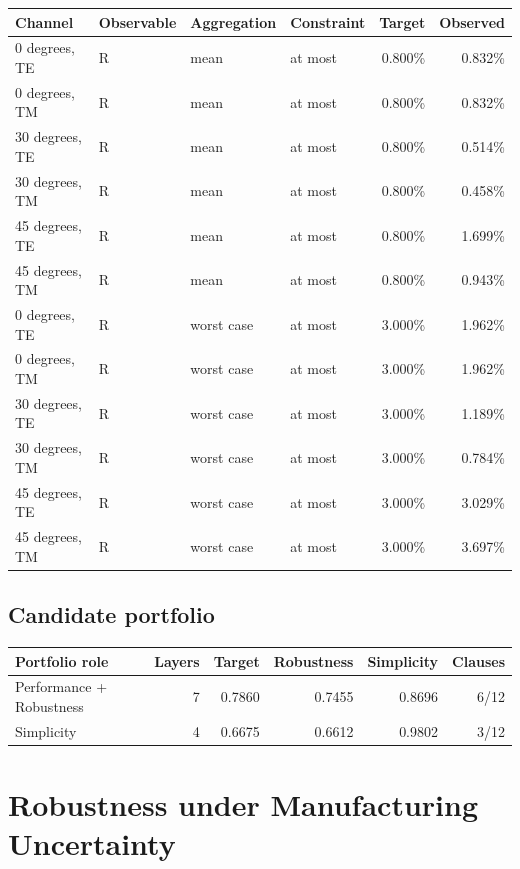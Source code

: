 \documentclass[11pt]{article}
\begin{document}
\begin{longtable}[]{@{}llllrr@{}}
\toprule
Channel & Observable & Aggregation & Constraint & Target & Observed \\
\midrule
\endhead
0 degrees, TE & R & mean & at most & 0.800\% & 0.832\% \\
0 degrees, TM & R & mean & at most & 0.800\% & 0.832\% \\
30 degrees, TE & R & mean & at most & 0.800\% & 0.514\% \\
30 degrees, TM & R & mean & at most & 0.800\% & 0.458\% \\
45 degrees, TE & R & mean & at most & 0.800\% & 1.699\% \\
45 degrees, TM & R & mean & at most & 0.800\% & 0.943\% \\
0 degrees, TE & R & worst case & at most & 3.000\% & 1.962\% \\
0 degrees, TM & R & worst case & at most & 3.000\% & 1.962\% \\
30 degrees, TE & R & worst case & at most & 3.000\% & 1.189\% \\
30 degrees, TM & R & worst case & at most & 3.000\% & 0.784\% \\
45 degrees, TE & R & worst case & at most & 3.000\% & 3.029\% \\
45 degrees, TM & R & worst case & at most & 3.000\% & 3.697\% \\
\bottomrule
\end{longtable}

\hypertarget{candidate-portfolio}{%
\subsection{Candidate portfolio}\label{candidate-portfolio}}

\begin{longtable}[]{@{}lrrrrr@{}}
\toprule
Portfolio role & Layers & Target & Robustness & Simplicity & Clauses \\
\midrule
\endhead
Performance + Robustness & 7 & 0.7860 & 0.7455 & 0.8696 & 6/12 \\
Simplicity & 4 & 0.6675 & 0.6612 & 0.9802 & 3/12 \\
\bottomrule
\end{longtable}

\hypertarget{robustness-under-manufacturing-uncertainty}{%
\section{Robustness under Manufacturing Uncertainty}\label{robustness-under-manufacturing-uncertainty}}
\end{document}

